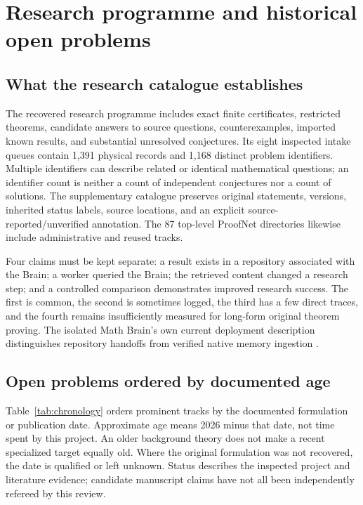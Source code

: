 \section{Research programme and historical open problems}
\label{sec:research}

\subsection{What the research catalogue establishes}

The recovered research programme includes exact finite certificates, restricted theorems, candidate answers to source questions, counterexamples, imported known results, and substantial unresolved conjectures. Its eight inspected intake queues contain 1,391 physical records and 1,168 distinct problem identifiers. Multiple identifiers can describe related or identical mathematical questions; an identifier count is neither a count of independent conjectures nor a count of solutions. The supplementary catalogue preserves original statements, versions, inherited status labels, source locations, and an explicit source-reported/unverified annotation. The 87 top-level ProofNet directories likewise include administrative and reused tracks.

Four claims must be kept separate: a result exists in a repository associated with the Brain; a worker queried the Brain; the retrieved content changed a research step; and a controlled comparison demonstrates improved research success. The first is common, the second is sometimes logged, the third has a few direct traces, and the fourth remains insufficiently measured for long-form original theorem proving. The isolated Math Brain's own current deployment description distinguishes repository handoffs from verified native memory ingestion \citep{mathreadme}.

\subsection{Open problems ordered by documented age}

Table~\ref{tab:chronology} orders prominent tracks by the documented formulation or publication date. Approximate age means 2026 minus that date, not time spent by this project. An older background theory does not make a recent specialized target equally old. Where the original formulation was not recovered, the date is qualified or left unknown. Status describes the inspected project and literature evidence; candidate manuscript claims have not all been independently refereed by this review.

